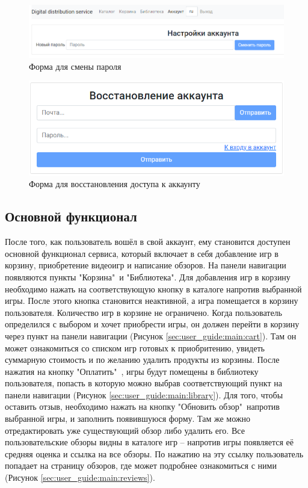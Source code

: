\begin{figure}[ht]
	\centering
	  \includegraphics[scale=0.55]{attachments/passwordchange.png}  
	  \caption{ Форма для смены пароля }
	  \label{sec:user_guide:account:passwordchange}
\end{figure}

\begin{figure}[ht]
	\centering
	  \includegraphics[scale=0.8]{attachments/restore.png}  
	  \caption{ Форма для восстановления доступа к аккаунту }
	  \label{sec:user_guide:account:restore}
\end{figure}

\subsection{Основной функционал} 
\label{sec:user_guide:main}

После того, как пользователь вошёл в свой аккаунт, ему становится доступен основной функционал сервиса, который включает в себя
добавление игр в корзину, приобретение видеоигр и написание обзоров. На панели навигации появляются пункты "Корзина"\ и "Библиотека".
Для добавления игр в корзину необходимо нажать на соответствующую кнопку в каталоге напротив выбранной игры. После этого кнопка становится
неактивной, а игра помещается в корзину пользователя. Количество игр в корзине не ограничено. Когда пользователь определился с выбором и
хочет приобрести игры, он должен перейти в корзину через пункт на панели навигации (Рисунок \ref*{sec:user_guide:main:cart}). Там он 
может ознакомиться со списком игр готовых к приобритению, увидеть суммарную стоимость и по желанию удалить продукты из корзины. После
нажатия на кнопку "Оплатить"\ , игры будут помещены в библиотеку пользователя, попасть в которую можно выбрав соответствующий пункт на панели
навигации (Рисунок \ref*{sec:user_guide:main:library}). Для того, чтобы оставить отзыв, необходимо нажать на кнопку "Обновить обзор"\
напротив выбранной игры, и заполнить появившуюся форму. Там же можно отредактировать уже существующий обзор либо удалить его. Все пользовательские
обзоры видны в каталоге игр -- напротив игры появляется её средняя оценка и ссылка на все обзоры. По нажатию на эту ссылку пользователь
попадает на страницу обзоров, где может подробнее ознакомиться с ними (Рисунок \ref*{sec:user_guide:main:reviews}).

